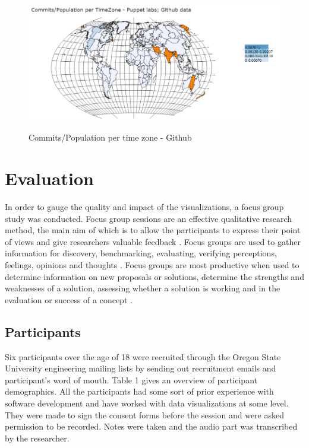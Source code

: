 \documentclass[double,12pt]{beavtex}
\begin{document}
\begin{figure}[H]
\centering
\includegraphics[width=130mm,height=60mm]{image10.PNG}
\caption{Commits/Population per time zone - Github}
\label{fig:div3}
\end{figure}

\chapter{Evaluation}
In order to gauge the quality and impact of the visualizations, a focus group study was conducted. Focus group sessions are an effective qualitative research method, the main aim of which is to allow the participants to express their point of views and give researchers valuable feedback \cite{villard}.  Focus groups are used to gather information for discovery, benchmarking, evaluating, verifying perceptions, feelings, opinions and thoughts \cite{patton1990}. Focus groups are most productive when used to determine information on new proposals or solutions, determine the strengths and weaknesses of a solution, assessing whether a solution is working and in the evaluation or success of a concept \cite{greenbaum1993}.

\section{Participants}
Six participants over the age of 18 were recruited through the Oregon State University engineering mailing lists by sending out recruitment emails and participant's word of mouth. Table 1 gives an overview of participant demographics. All the participants had some sort of prior experience with software development and have worked with data visualizations at some level. They were made to sign the consent forms before the session and were asked permission to be recorded. Notes were taken and the audio part was transcribed by the researcher.
\end{document}
